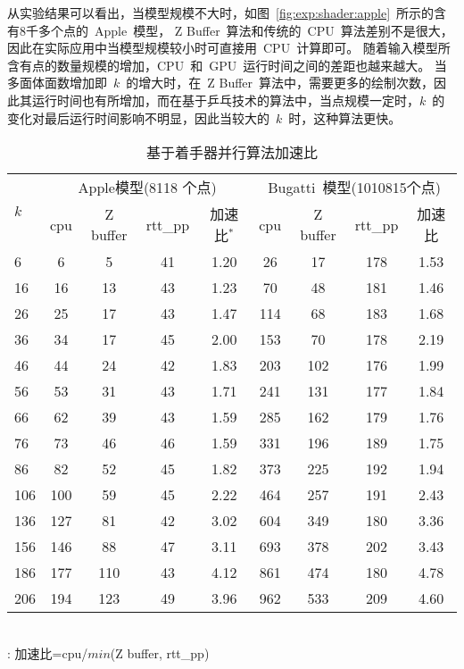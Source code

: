 从实验结果可以看出，当模型规模不大时，如图~\ref{fig:exp:shader:apple}~所示的含有8千多个点的~Apple~模型，
Z Buffer~算法和传统的~CPU~算法差别不是很大，因此在实际应用中当模型规模较小时可直接用~CPU~计算即可。
随着输入模型所含有点的数量规模的增加，CPU~和~GPU~运行时间之间的差距也越来越大。
当多面体面数增加即~$k$~的增大时，在~Z Buffer~算法中，需要更多的绘制次数，因此其运行时间也有所增加，而在基于乒乓技术的算法中，当点规模一定时，$k$~的变化对最后运行时间影响不明显，因此当较大的~$k$~时，这种算法更快。

\begin{table}
\centering
\caption{基于着手器并行算法加速比}
\label{tab:exper:shadertime}
\begin{minipage}[t]{0.8\textwidth}
  \begin{tabular}{p{1.5cm}<{\centering}cccc cccc} %
  \toprule[1.5pt]
  \multirow{2}{*}{$k$} & \multicolumn{4}{c}{Apple模型(8118 个点)} &
  \multicolumn{4}{c}{Bugatti~模型(1010815个点)}\\
  \cmidrule(lr){2-5}\cmidrule(lr){6-9}
  ~&cpu & Z buffer  & rtt\_pp & 加速比$^{*}$ & cpu  & Z buffer& rtt\_pp& 加速比 \\
  \midrule[1pt]
 6	 & 6 	& 5 	& 41 &	1.20 &	26	& 17	&178  &	1.53 \\
16	 & 16	& 13	& 43 &	1.23 &	70	& 48	&181  &	1.46 \\
26	 & 25	& 17	& 43 &	1.47 &	114	& 68	&183  &	1.68 \\
36	 & 34	& 17	& 45 &	2.00 &	153	& 70	&178  &	2.19 \\
46	 & 44	& 24	& 42 &	1.83 &	203	& 102	&176  &	1.99 \\
56	 & 53	& 31	& 43 &	1.71 &	241	& 131	&177  &	1.84 \\
66	 & 62	& 39	& 43 &	1.59 &	285	& 162	&179  &	1.76 \\
76	 & 73	& 46	& 46 &	1.59 &	331	& 196	&189  &	1.75 \\
86	 & 82	& 52	& 45 &	1.82 &	373	& 225	&192  &	1.94 \\
106	 & 100	& 59	& 45 &	2.22 &	464	& 257	&191  &	2.43 \\
136	 & 127	& 81	& 42 &	3.02 &	604	& 349	&180  &	3.36 \\
156	 & 146	& 88	& 47 &	3.11 &	693	& 378	&202  &	3.43 \\
186	 & 177	& 110	& 43 &	4.12 &	861	& 474	&180  &	4.78 \\
206	 & 194	& 123	& 49 &	3.96 &	962	& 533	&209  &	4.60 \\
  \bottomrule[1.5pt]
\end{tabular}\\[2pt]
  \footnotesize *: 加速比=cpu/$min$(Z buffer, rtt\_pp)
\end{minipage}
\end{table}

